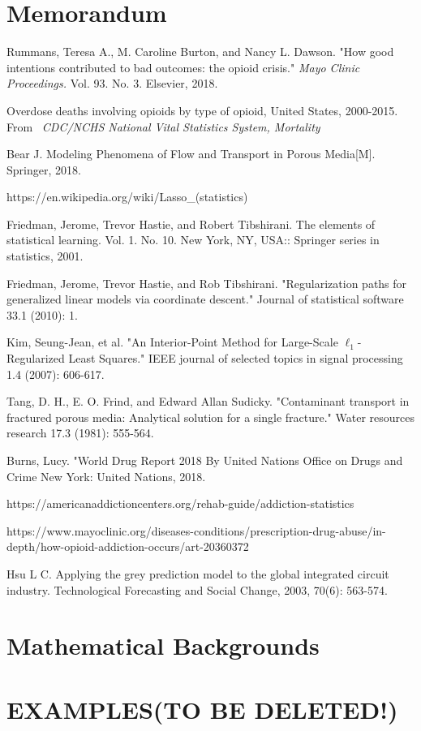 \documentclass[12pt]{article} %
\begin{document}
\newpage
\section{Memorandum}


\newpage
\begin{thebibliography}{99} %

Rummans, Teresa A., M. Caroline Burton, and Nancy L. Dawson. "How good intentions contributed to bad outcomes: the opioid crisis." \textit{Mayo Clinic Proceedings.} Vol. 93. No. 3. Elsevier, 2018.

Overdose deaths involving opioids by type of opioid, United States, 2000-2015. From  \textit{CDC/NCHS National Vital Statistics System, Mortality}

Bear J. Modeling Phenomena of Flow and Transport in Porous Media[M]. Springer, 2018.

https://en.wikipedia.org/wiki/Lasso\_(statistics)

Friedman, Jerome, Trevor Hastie, and Robert Tibshirani. The elements of statistical learning. Vol. 1. No. 10. New York, NY, USA:: Springer series in statistics, 2001.

Friedman, Jerome, Trevor Hastie, and Rob Tibshirani. "Regularization paths for generalized linear models via coordinate descent." Journal of statistical software 33.1 (2010): 1.

Kim, Seung-Jean, et al. "An Interior-Point Method for Large-Scale $\ell_1 $-Regularized Least Squares." IEEE journal of selected topics in signal processing 1.4 (2007): 606-617.

Tang, D. H., E. O. Frind, and Edward Allan Sudicky. "Contaminant transport in fractured porous media: Analytical solution for a single fracture." Water resources research 17.3 (1981): 555-564.

Burns, Lucy. "World Drug Report 2018 By United Nations Office on Drugs and Crime New York: United Nations, 2018.

https://americanaddictioncenters.org/rehab-guide/addiction-statistics

https://www.mayoclinic.org/diseases-conditions/prescription-drug-abuse/in-depth/how-opioid-addiction-occurs/art-20360372

Hsu L C. Applying the grey prediction model to the global integrated circuit industry. Technological Forecasting and Social Change, 2003, 70(6): 563-574.

\end{thebibliography}

\newpage
\appendix
\appendixpage
\section{Mathematical Backgrounds}
\newpage
\section{EXAMPLES(TO BE DELETED!)}

\end{document}
